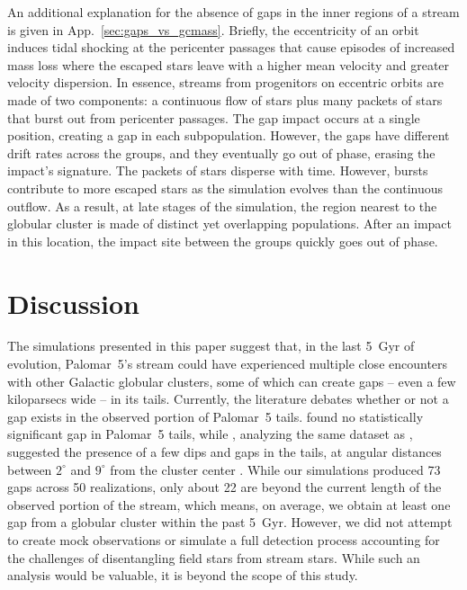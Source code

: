         An additional explanation for the absence of gaps in the inner regions of a stream is given in App.~\ref{sec:gaps_vs_gcmass}. Briefly, the eccentricity of an orbit induces tidal shocking at the pericenter passages that cause episodes of increased mass loss where the escaped stars leave with a higher mean velocity and greater velocity dispersion. In essence, streams from progenitors on eccentric orbits are made of two components: a continuous flow of stars plus many packets of stars that burst out from pericenter passages. The gap impact occurs at a single position, creating a gap in each subpopulation. However, the gaps have different drift rates across the groups, and they eventually go out of phase, erasing the impact's signature. The packets of stars disperse with time. However, bursts contribute to more escaped stars as the simulation evolves than the continuous outflow. As a result, at late stages of the simulation, the region nearest to the globular cluster is made of distinct yet overlapping populations. After an impact in this location, the impact site between the groups quickly goes out of phase. 


\section{Discussion}\label{sec:discussion}

    The simulations presented in this paper suggest that, in the last 5~Gyr of evolution, Palomar~5's stream could have experienced multiple close encounters with other Galactic globular clusters, some of which can create gaps -- even a few kiloparsecs wide -- in its tails. Currently, the literature debates whether or not a gap exists in the observed portion of Palomar~5 tails. \citet{2016ApJ...819....1I} found no statistically significant gap in Palomar~5 tails, while \citet{2017MNRAS.470...60E}, analyzing the same dataset as \citet{2016ApJ...819....1I}, suggested the presence of a few dips and gaps in the tails, at angular distances between $2^\circ$ and $9^\circ$ from the cluster center \citep[see also][]{ 2020ApJ...889...70B}. While our simulations produced 73 gaps across 50 realizations, only about 22 are beyond the current length of the observed portion of the stream, which means, on average, we obtain at least one gap from a globular cluster within the past 5~Gyr. However, we did not attempt to create mock observations or simulate a full detection process accounting for the challenges of disentangling field stars from stream stars. While such an analysis would be valuable, it is beyond the scope of this study.
  
